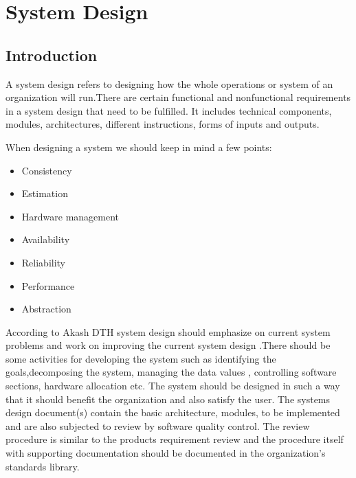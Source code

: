\chapter{System Design}
\begin{spacing}{1}
\setlength{\parskip}{0.3in}
\graphicspath{{./Chapter4/}}

\section{Introduction}
A system design refers to designing how the whole operations or system of an organization will run.There are certain functional and nonfunctional requirements in a system design that need to be fulfilled. It includes technical components, modules, architectures, different instructions, forms of inputs and outputs.

When designing a system we should keep in mind a few points:
\begin{itemize}
	\item Consistency
	\item Estimation
	\item Hardware management
	\item Availability
	\item Reliability
	\item Performance
	\item Abstraction
\end{itemize}
According to Akash DTH system design should emphasize on current system problems and work on improving the current system design .There should be some activities for developing the system such as identifying the goals,decomposing the system, managing the data values , controlling software sections, hardware allocation etc. The system should be designed in such a way that it should benefit the organization and also satisfy the user. The systems design document(s) contain the basic architecture, modules, to be implemented and are also subjected to review by software quality control. The review procedure is similar to the products requirement review and the procedure itself with supporting documentation should be documented in the organization’s standards library.


\end{spacing}
